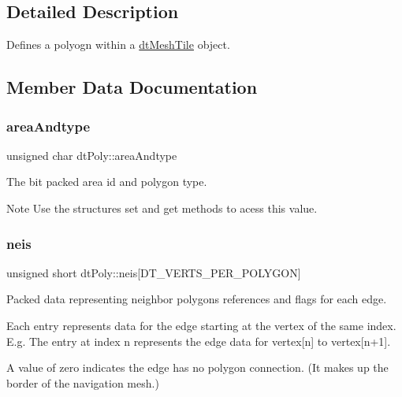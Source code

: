 \subsection{Detailed Description}
Defines a polyogn within a \hyperlink{structdtMeshTile}{dt\+Mesh\+Tile} object. 

\subsection{Member Data Documentation}
\mbox{\label{structdtPoly_af3caa090f5d4776766bf56f82c27a899}} 
\subsubsection{\texorpdfstring{area\+Andtype}{areaAndtype}}
{\footnotesize\ttfamily unsigned char dt\+Poly\+::area\+Andtype}

The bit packed area id and polygon type. \begin{DoxyNote}{Note}
Use the structure\textquotesingle{}s set and get methods to acess this value. 
\end{DoxyNote}
\mbox{\label{structdtPoly_ac4f5aa32df32aa5b1385f76f697376af}} 
\subsubsection{\texorpdfstring{neis}{neis}}
{\footnotesize\ttfamily unsigned short dt\+Poly\+::neis\mbox{[}D\+T\+\_\+\+V\+E\+R\+T\+S\+\_\+\+P\+E\+R\+\_\+\+P\+O\+L\+Y\+G\+ON\mbox{]}}



Packed data representing neighbor polygons references and flags for each edge. 

\begin{DoxyParagraph}{}

\end{DoxyParagraph}
Each entry represents data for the edge starting at the vertex of the same index. E.\+g. The entry at index n represents the edge data for vertex\mbox{[}n\mbox{]} to vertex\mbox{[}n+1\mbox{]}.

A value of zero indicates the edge has no polygon connection. (It makes up the border of the navigation mesh.)

